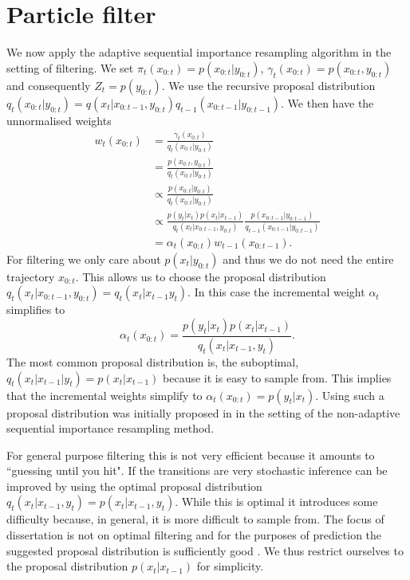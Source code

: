 \section{Particle filter}
\label{sec_bootstrap}
We now apply the adaptive sequential importance resampling algorithm in the setting of filtering. We set $\pi_t(x_{0:t}) = p(x_{0:t}|y_{0:t})$, $\gamma_t(x_{0:t}) = p(x_{0:t}, y_{0:t})$ and consequently $Z_t = p(y_{0:t})$. We use the recursive proposal distribution $q_t(x_{0:t}|y_{0:t}) = q(x_t|x_{0:t-1}, y_{0:t})q_{t-1}(x_{0:t-1}|y_{0:t-1})$. We then have the unnormalised weights
\begin{equation}
\begin{aligned}
w_t(x_{0:t}) &= \frac{\gamma_t(x_{0:t})}{q_t(x_{0:t}|y_{0:t})} \\
&= \frac{p(x_{0:t}, y_{0:t})}{q_t(x_{0:t}|y_{0:t})} \\
&\propto \frac{p(x_{0:t}| y_{0:t})}{q_t(x_{0:t}|y_{0:t})} \\
&\propto \frac{p(y_t|x_t)p(x_t|x_{t-1})}{q_t(x_t|x_{0:t-1}, y_{0:t})}\frac{p(x_{0:t-1}| y_{0:t-1})}{q_{t-1}(x_{0:t-1}|y_{0:t-1})} \\
&= \alpha_t(x_{0:t})w_{t-1}(x_{0:t-1}).
\end{aligned}
\label{eq_pf_weights}
\end{equation}
For filtering we only care about $p(x_t|y_{0:t})$ and thus we do not need the entire trajectory $x_{0:t}$. This allows us to choose the proposal distribution $q_t(x_t|x_{0:t-1}, y_{0:t}) = q_t(x_{t}|x_{t-1}y_{t})$. In this case the incremental weight $\alpha_t$ simplifies to
\begin{equation}
\alpha_t(x_{0:t}) = \frac{p(y_t|x_t)p(x_t|x_{t-1})}{q_t(x_t|x_{t-1}, y_{t})}.
\label{eq_pf_simpweights}
\end{equation}
The most common proposal distribution is, the suboptimal, $q_t(x_t|x_{t-1}|y_t) = p(x_t|x_{t-1})$ because it is easy to sample from. This implies that the incremental weights simplify to $\alpha_t(x_{0:t}) = p(y_t|x_t)$. Using such a proposal distribution was initially proposed in \cite{gordon} in the setting of the non-adaptive sequential importance resampling method. 

For general purpose filtering this is not very efficient because it amounts to ``guessing until you hit". If the transitions are very stochastic inference can be improved by using the optimal proposal distribution $q_t(x_t|x_{t-1}, y_t) = p(x_t|x_{t-1}, y_t)$. While this is optimal it introduces some difficulty because, in general, it is more difficult to sample from. The focus of dissertation is not on optimal filtering and for the purposes of prediction the suggested proposal distribution is sufficiently good \cite{murphy1}. We thus restrict ourselves to the proposal distribution $p(x_t|x_{t-1})$ for simplicity.

